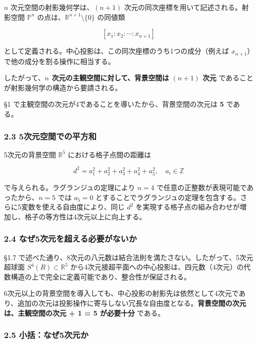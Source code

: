 \documentclass[a4paper,11pt]{ltjsarticle}
\begin{document}
\(n\) 次元空間の射影幾何学は、\((n+1)\)
次元の同次座標を用いて記述される。射影空間 \(\mathbb{P}^n\)
の点は、\(\mathbb{R}^{n+1} \setminus \{0\}\) の同値類

\[[x_1 : x_2 : \cdots : x_{n+1}]\]

として定義される。中心投影は、この同次座標のうち1つの成分（例えば
\(x_{n+1}\)）で他の成分を割る操作に相当する。

したがって、\textbf{\(n\) 次元の主観空間に対して、背景空間は \((n+1)\)
次元} であることが射影幾何学の構造から要請される。

§1 で主観空間の次元が4であることを導いたから、背景空間の次元は
\textbf{5} である。

\subsubsection{2.3
5次元空間での平方和}\label{ux6b21ux5143ux7a7aux9593ux3067ux306eux5e73ux65b9ux548c}

5次元の背景空間 \(\mathbb{R}^5\) における格子点間の距離は

\[d^2 = a_1^2 + a_2^2 + a_3^2 + a_4^2 + a_5^2, \quad a_i \in \mathbb{Z}\]

で与えられる。ラグランジュの定理により \(n = 4\)
で任意の正整数が表現可能であったから、\(n = 5\) では \(a_5 = 0\)
とすることでラグランジュの定理を包含する。さらに5変数を使える自由度により、同じ
\(d^2\)
を実現する格子点の組み合わせが増加し、格子の等方性は4次元以上に向上する。

\subsubsection{2.4
なぜ5次元を超える必要がないか}\label{ux306aux305c5ux6b21ux5143ux3092ux8d85ux3048ux308bux5fc5ux8981ux304cux306aux3044ux304b}

§1.7
で述べた通り、8次元の八元数は結合法則を満たさない。したがって、5次元超球面
\(S^4(R) \subset \mathbb{R}^5\)
から4次元接超平面への中心投影は、四元数（4次元）の代数構造の上で完全に定義可能であり、整合性が保証される。

6次元以上の背景空間を導入しても、中心投影の射影先は依然として4次元であり、追加の次元は投影操作に寄与しない冗長な自由度となる。\textbf{背景空間の次元は、主観空間の次元
+ 1 = 5 が必要十分} である。

\subsubsection{2.5
小括：なぜ5次元か}\label{ux5c0fux62ecux306aux305c5ux6b21ux5143ux304b}
\end{document}
